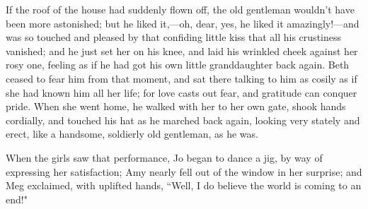 If the roof of the house had suddenly flown off, the old gentleman
wouldn't have been more astonished; but he liked
it,---oh, dear, yes, he liked it amazingly!---and was so touched and
pleased by that confiding little kiss that all his crustiness vanished;
and he just set her on his knee, and laid his wrinkled cheek against her
rosy one, feeling as if he had got his own little granddaughter back
again. Beth ceased to fear him from that moment, and sat there talking
to him as cosily as if she had known him all her life; for love casts
out fear, and gratitude can conquer pride. When she went home, he walked
with her to her own gate, shook hands cordially, and touched his hat as
he marched back again, looking very stately and erect, like a handsome,
soldierly old gentleman, as he was.

When the girls saw that performance, Jo began to dance a jig, by way of
expressing her satisfaction; Amy nearly fell out of the window in her
surprise; and Meg exclaimed, with uplifted hands, ``Well, I do believe
the world is coming to an end!"
